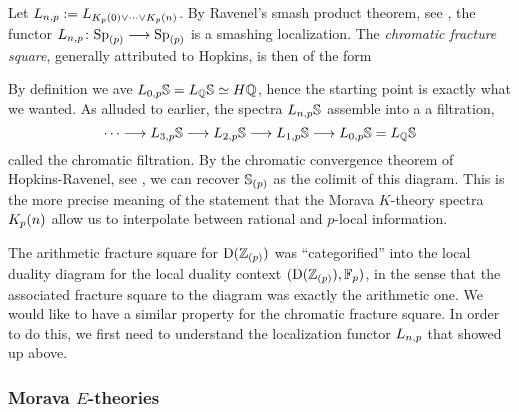 \begin{construction}
    \label{ch0:const:chromatic-fracture-square}
    Let $L\np := L_{K_p(0)\vee \cdots \vee \Kpn}$. By Ravenel's smash product theorem, see \cite[7.5.6]{ravenel_92}, the functor $L\np\colon \Sp_{(p)}\longrightarrow \Sp_{(p)}$ is a smashing localization. The \emph{chromatic fracture square}, generally attributed to Hopkins, is then of the form 
    \begin{center}
    \end{center}
    By definition we ave $L_{0,p} \S = L_\Q \S \simeq H\Q$, hence the starting point is exactly what we wanted. As alluded to earlier, the spectra $L\np\S$ assemble into a a filtration, 
    \[\cdots \longrightarrow L_{3,p}\S \longrightarrow L_{2,p}\S \longrightarrow L_{1,p}\S \longrightarrow L_{0,p} \S = L_\Q\S\]
    called the chromatic filtration. By the chromatic convergence theorem of Hopkins-Ravenel, see \cite[7.5.7]{ravenel_92}, we can recover $\S_{(p)}$ as the colimit of this diagram. This is the more precise meaning of the statement that the Morava $K$-theory spectra $\Kpn$ allow us to interpolate between rational and $p$-local information. 
\end{construction}

\begin{remark}
    \label{ch0:rm:chromatic-square-from-duality}
    The arithmetic fracture square for $\Der(\Z_{(p)})$ was ``categorified'' into the local duality diagram for the local duality context $(\Der(\Z_{(p)}), \F_p)$, in the sense that the associated fracture square to the diagram was exactly the arithmetic one. We would like to have a similar property for the chromatic fracture square. In order to do this, we first need to understand the localization functor $L\np$ that showed up above. 
\end{remark}  






\subsubsection{Morava \texorpdfstring{$E$}{E}-theories}
\label{ch0:sssec:morava-E-theories}


